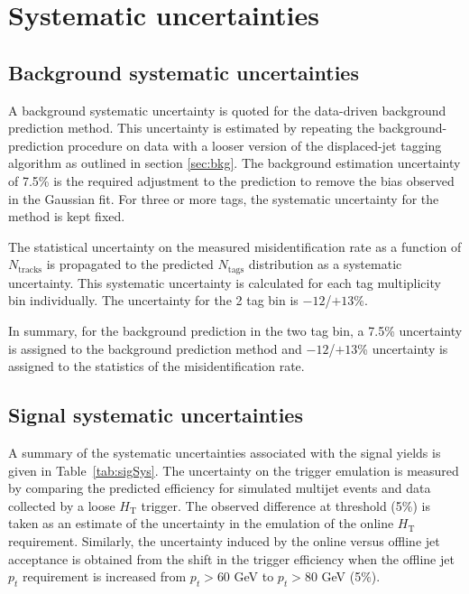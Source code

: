 


\section{Systematic uncertainties}
\label{sec:sys}

\subsection{Background systematic uncertainties}
\label{sec:bkgsys}

A background systematic uncertainty is quoted for the data-driven background prediction
method. This uncertainty is estimated by repeating the
background-prediction procedure on data with a looser version of the
displaced-jet tagging algorithm as outlined in section \ref{sec:bkg}.  The
background estimation uncertainty of 7.5\% is the required adjustment
to the prediction to remove the bias observed in the Gaussian fit.  For three or more tags, the systematic uncertainty for the
method is kept fixed.

The statistical uncertainty on the measured misidentification rate as a
function of $N_{\textrm{tracks}}$ is propagated to the predicted
$N_{\textrm{tags}}$ distribution as a systematic uncertainty. This systematic uncertainty 
is calculated for each tag multiplicity bin individually. The uncertainty for the 2 tag
bin is ${-}12$/$+13$\%.

In summary, for the background prediction in the two tag bin, a 7.5\% uncertainty is assigned to the
background prediction method and ${-}12$/$+13$\% uncertainty is assigned to 
the statistics of the misidentification rate. 

\subsection{Signal systematic uncertainties}
\label{sec:sigsys}
A summary of the systematic uncertainties associated with the signal
yields is given in Table~\ref{tab:sigSys}.  The uncertainty on the
trigger emulation is measured by comparing the predicted efficiency
for simulated multijet events and data collected by a loose
$H_{\textrm{T}}$ trigger. The observed difference at threshold (5\%)
is taken as an estimate of the uncertainty in the emulation of the
online $H_{\textrm{T}}$ requirement.  Similarly, the uncertainty
induced by the online versus offline jet acceptance is obtained from
the shift in the trigger efficiency when the offline jet $p_{t}$
requirement is increased from $p_{t}>60$ GeV to $p_{t}>80$ GeV (5\%).

